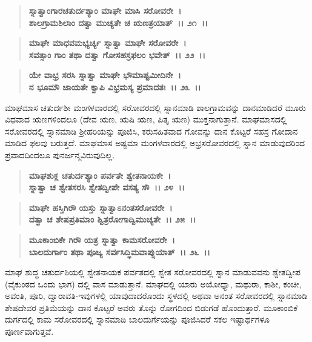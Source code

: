 \begin{verse}
\textbf{ಸ್ನಾತ್ವಾಂಗಾರಚತುರ್ದಶ್ಯಾಂ ಮಾಘೇ ಮಾಸಿ ಸರೋವರೇ~।}\\\textbf{ಶಾಲಗ್ರಾಮಶಿಲಾಂ ದತ್ವಾ ಮುಚ್ಯತೇ ಚ ಋಣತ್ರಯಾತ್~।। ೨೧~।। }
\end{verse}

\begin{verse}
\textbf{ಮಾಘೇ ಮಾಧವಮಭ್ಯರ್ಚ್ಯ ಸ್ನಾತ್ವಾ ಮಾಘೇ ಸರೋವರೇ~।}\\\textbf{ಸವತ್ಸಾಂ ಗಾಂ ತಥಾ ದತ್ವಾ ಗೋಸಹಸ್ರಫಲಂ ಭವೇತ್~।। ೨೨~।।} 
\end{verse}

\begin{verse}
\textbf{ಯೇ ವಾಭ್ರ ಸರಸಿ ಸ್ನಾತ್ವಾ ಮಾಘೇ ಭೌಮಾಷ್ಟಮೀದಿನೇ~।}\\\textbf{ನ ಭೂಮೌ ಜಾಯತೇ ಕ್ವಾಪಿ ವಿಭ್ರಮಸ್ಯ ಪ್ರಮಾದತಃ~।। ೨೩~।।}
\end{verse}

ಮಾಘಮಾಸ ಚತುರ್ದಶೀ ಮಂಗಳವಾರದಲ್ಲಿ ಸರೋವರದಲ್ಲಿ ಸ್ನಾನಮಾಡಿ ಶಾಲಗ್ರಾಮವನ್ನು ದಾನಮಾಡಿದರೆ ಮೂರು ವಿಧವಾದ ಋಣಗಳಿಂದಲೂ (ದೇವ ಋಣ, ಋಷಿ ಋಣ, ಪಿತೃ ಋಣ) ಮುಕ್ತನಾಗುತ್ತಾನೆ. ಮಾಘಮಾಸದಲ್ಲಿ ಸರೋವರದಲ್ಲಿ ಸ್ನಾನಮಾಡಿ ಶ‍್ರೀಹರಿಯನ್ನು ಪೂಜಿಸಿ, ಕರುಸಹಿತವಾದ ಗೋವನ್ನು ದಾನ ಕೊಟ್ಟರೆ ಸಹಸ್ರ ಗೋದಾನ ಮಾಡಿದ ಫಲವು ಬರುತ್ತದೆ. ಮಾಘಮಾಸ ಅಷ್ಟಮಾ ಮಂಗಳವಾರದಲ್ಲಿ ಅಭ್ರಸರೋವರದಲ್ಲಿ ಸ್ನಾನ ಮಾಡುವುದರಿಂದ ಪ್ರವಾದದಿಂದಲೂ ಪುನರ್ಜನ್ಮವಿರುವುದಿಲ್ಲ.

\begin{verse}
\textbf{ಮಾಘಶುಕ್ಲ ಚತುರ್ದಶ್ಯಾಂ ಪರ್ವತೇ ಶ್ವೇತನಾಯಕೇ~।}\\\textbf{ಸ್ನಾತ್ವಾ ಚ ಶ್ವೇತಸರಸಿ ಶ್ವೇತದ್ವೀಪೇ ವಸತ್ಯ ಸೌ~।। ೨೪~।। }
\end{verse}

\begin{verse}
\textbf{ಮಾಘೇ ಹಸ್ತಿಗಿ‌ರೌ ಯಸ್ತು ಸ್ನಾತ್ವಾಽನಂತಸರೋವರೇ~।}\\\textbf{ದತ್ವಾ ಚ ಶೇಷಪ್ರತಿಮಾಂ ಶ್ವಿತ್ರರೋಗಾದ್ವಿಮುಚ್ಯತೇ~।। ೨೫~।।}
\end{verse}

\begin{verse}
\textbf{ಮೂಕಾಂಬಿಕೇ ಗಿರೌ‌ ಯತ್ರ ಸ್ನಾತ್ವಾ ಕಾಮಸರೋವರೇ~।}\\\textbf{ಬಾಲದುರ್ಗಾಂ ತಥಾ ಪೂಜ್ಯ ಸರ್ವಸಿದ್ಧಿಮವಾಪ್ನುಯಾತ್~।। ೨೬~।।}
\end{verse}

ಮಾಘ ಶುದ್ಧ ಚತುರ್ದಶಿಯಲ್ಲಿ ಶ್ವೇತನಾಯಕ ಪರ್ವತದಲ್ಲಿ ಶ್ವೇತ ಸರೋವರದಲ್ಲಿ ಸ್ನಾನ ಮಾಡುವವನು ಶ್ವೇತದ್ವೀಪ (ವೈಕುಂಠದ ಒಂದು ಭಾಗ) ದಲ್ಲಿ ವಾಸ ಮಾಡುತ್ತಾನೆ. ಮಾಘದಲ್ಲಿ ಯಾರು ಅಯೋಧ್ಯಾ, ಮಥುರಾ, ಕಾಶೀ, ಕಂಚೀ, ಅವಂತಿ, ಪೂರಿ, ದ್ವಾರಾವತಿ-ಇವುಗಳಲ್ಲಿ ಯಾವುದಾದರೊಂದು ಸ್ಥಳದಲ್ಲಿ ಅಥವಾ ಅನಂತ ಸರೋವರದಲ್ಲಿ ಸ್ನಾನಮಾಡಿ ಶೇಷದೇವರ ಪ್ರತಿಮೆಯನ್ನು ದಾನ ಕೊಟ್ಟರೆ ಅವರು ತೊನ್ನು ರೋಗದಿಂದ ಬಿಡುಗಡೆ ಹೊಂದುತ್ತಾರೆ. ಮೂಕಾಂಬಿಕೆ ದುರ್ಗದಲ್ಲಿ ಕಾಮ ಸರೋವರದಲ್ಲಿ ಸ್ನಾನಮಾಡಿ ಬಾಲದುರ್ಗೆಯನ್ನು ಪೂಜಿಸಿದರೆ ಸಕಲ ಇಷ್ಟಾರ್ಥಗಳೂ ಪೂರ್ಣವಾಗುತ್ತವೆ.

